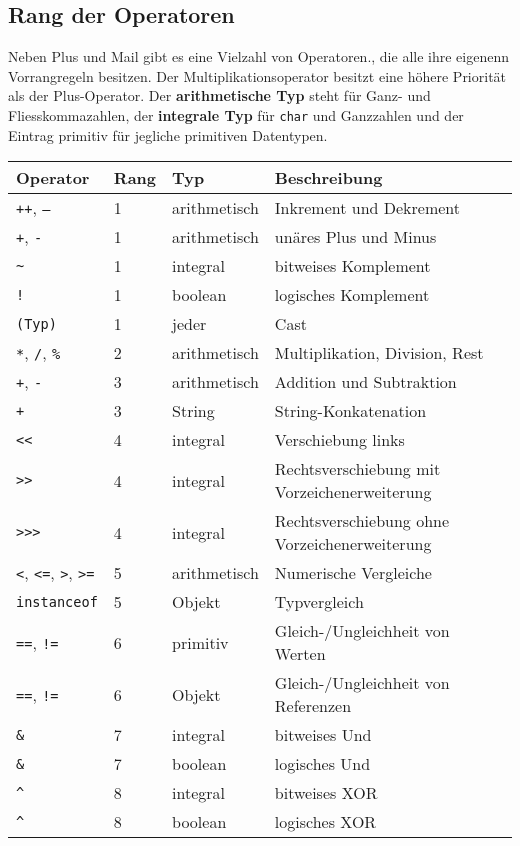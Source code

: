 \subsection{Rang der Operatoren}
Neben Plus und Mail gibt es eine Vielzahl von Operatoren., die alle ihre eigenenn Vorrangregeln besitzen. Der Multiplikationsoperator besitzt eine höhere Priorität als der Plus-Operator. Der \textbf{arithmetische Typ} steht für Ganz- und Fliesskommazahlen, der \textbf{integrale Typ} für \texttt{char} und Ganzzahlen und der Eintrag primitiv für jegliche primitiven Datentypen.
\begin{table}[H]
\centering
\begin{tabular}{llll}
\hline
Operator&Rang&Typ&Beschreibung\\\hline
\texttt{++}, \texttt{--}&1&arithmetisch&Inkrement und Dekrement\\
\texttt{+}, \texttt{-}&1&arithmetisch&unäres Plus und Minus\\
\texttt{\~}&1&integral&bitweises Komplement\\
\texttt{!}&1&boolean&logisches Komplement\\
\texttt{(Typ)}&1&jeder&Cast\\\hline
\texttt{*}, \texttt{/}, \texttt{\%}&2&arithmetisch&Multiplikation, Division, Rest\\\hline
\texttt{+}, \texttt{-}&3&arithmetisch&Addition und Subtraktion\\
\texttt{+}&3&String&String-Konkatenation\\
\texttt{<<}&4&integral&Verschiebung links\\
\texttt{>>}&4&integral&Rechtsverschiebung mit Vorzeichenerweiterung\\
\texttt{>>>}&4&integral&Rechtsverschiebung ohne Vorzeichenerweiterung\\\hline
\texttt{<}, \texttt{<=}, \texttt{>}, \texttt{>=}&5&arithmetisch&Numerische Vergleiche\\
\texttt{instanceof}&5&Objekt&Typvergleich\\
\texttt{==}, \texttt{!=}&6&primitiv&Gleich-/Ungleichheit von Werten\\
\texttt{==}, \texttt{!=}&6&Objekt&Gleich-/Ungleichheit von Referenzen\\
\texttt{\&}&7&integral&bitweises Und\\
\texttt{\&}&7&boolean&logisches Und\\\hline
\texttt{\^}&8&integral&bitweises XOR\\
\texttt{\^}&8&boolean&logisches XOR\\

\end{tabular}
\end{table}
